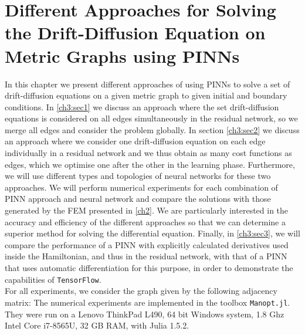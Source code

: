 \chapter{Different Approaches for Solving the Drift-Diffusion Equation on Metric Graphs using PINNs}

In this chapter we present different approaches of using PINNs to solve a set of drift-diffusion equations on a given metric graph to given initial and boundary conditions. In \cref{ch3:sec1} we discuss an approach where the set drift-diffusion equations is considered on all edges simultaneously in the residual network, so we merge all edges and consider the problem globally. In section \cref{ch3:sec2} we discuss an approach where we consider one drift-diffusion equation on each edge individually in a residual network and we thus obtain as many cost functions as edges, which we optimise one after the other in the learning phase. Furthermore, we will use different types and topologies of neural networks for these two approaches. We will perform numerical experiments for each combination of PINN approach and neural network and compare the solutions with those generated by the FEM presented in \cref{ch2}. We are particularly interested in the accuracy and efficiency of the different approaches so that we can determine a superior method for solving the differential equation. Finally, in \cref{ch3:sec3}, we will compare the performance of a PINN with explicitly calculated derivatives used inside the Hamiltonian, and thus in the residual network, with that of a PINN that uses automatic differentiation for this purpose, in order to demonstrate the capabilities of \lstinline!TensorFlow!. \\
For all experiments, we consider the graph given by the following adjacency matrix: 
The numerical experiments are implemented in the toolbox \lstinline!Manopt.jl!. They were run on a Lenovo ThinkPad L490, 64 bit Windows system, 1.8 Ghz Intel Core i7-8565U, 32 GB RAM, with Julia 1.5.2.



